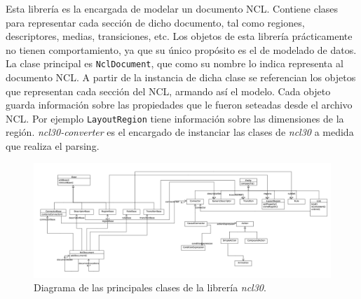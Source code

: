 Esta librería es la encargada de modelar un documento NCL. Contiene clases para representar cada sección de dicho documento, tal como regiones, descriptores, medias, transiciones, etc.
Los objetos de esta librería prácticamente no tienen comportamiento, ya que su único propósito es el de modelado de datos.
La clase principal es \texttt{NclDocument}, que como su nombre lo indica representa al documento NCL. A partir de la instancia de dicha clase se referencian los objetos que representan cada sección del NCL, armando así el modelo.
Cada objeto guarda información sobre las propiedades que le fueron seteadas desde el archivo NCL. Por ejemplo \texttt{LayoutRegion} tiene información sobre las dimensiones de la región.
\emph{ncl30-converter} es el encargado de instanciar las clases de \emph{ncl30} a medida que realiza el parsing.
	
\begin{figure}[h!]
	\centering
	\includegraphics[scale=0.26]{resources/uml-ncl30.jpg}
	\caption{Diagrama de las principales clases de la librería \emph{ncl30}.}
\end{figure}

\FloatBarrier
